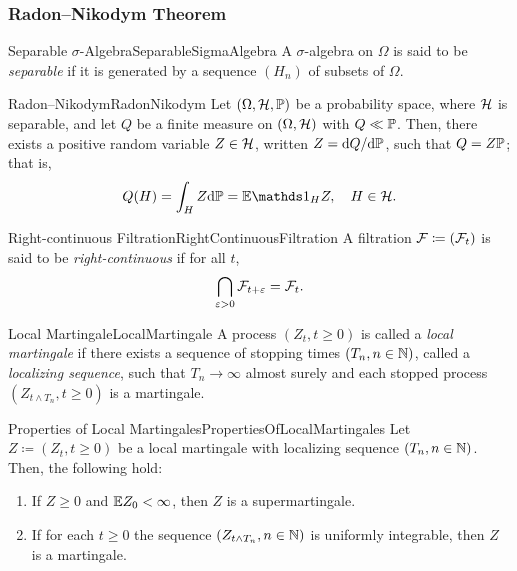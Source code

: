 \subsubsection{Radon--Nikodym Theorem}%
\begin{defn}{Separable \(\sigma\)-Algebra}{SeparableSigmaAlgebra}
	A \(\sigma\)-algebra on \(\Omega\) is said to be \emph{separable} if it is generated by a sequence \((H_n)\) of subsets of \(\Omega\).
\end{defn}

\begin{thm}{Radon--Nikodym}{RadonNikodym}%
	Let \((\Omega, \mathcal{H}, \mathbb{P})\) be a probability space, where \(\mathcal{H}\) is separable, and let \(Q\) be a finite measure on \((\Omega, \mathcal{H})\) with \(Q \ll \mathbb{P}\). Then, there exists a positive random variable \(Z \in \mathcal{H}\), written \(Z = \mathrm{d} Q / \mathrm{d} \mathbb{P}\), such that \(Q = Z \mathbb{P}\); that is,
	\begin{equation}\label{eq:RadonNikodymFormula}
		Q(H) = \int_H Z \di \Pm = \E \I_H Z, \quad H \in \cH.
	\end{equation}
\end{thm}

\begin{defn}{Right-continuous Filtration}{RightContinuousFiltration}
	A filtration \(\mathcal{F} \coloneqq (\mathcal{F}_t)\) is said to be \emph{right-continuous} if for all \(t\),
	\begin{equation*}
		\bigcap_{\varepsilon > 0} \mathcal{F}_{t+\varepsilon} = \mathcal{F}_t.
	\end{equation*}
\end{defn}

\begin{defn}{Local Martingale}{LocalMartingale}
	A process \((Z_t, t \ge 0)\) is called a \emph{local martingale} if there exists a sequence of stopping times \((T_n, n \in \mathbb{N})\), called a \emph{localizing sequence}, such that \(T_n \to \infty\) almost surely and each stopped process \((Z_{t \land T_n}, t \ge 0)\) is a martingale.
\end{defn}

\begin{thm}{Properties of Local Martingales}{PropertiesOfLocalMartingales}
	Let \(Z \coloneqq (Z_t, t \ge 0)\) be a local martingale with localizing sequence \((T_n, n \in \mathbb{N})\). Then, the following hold:
	\begin{enumerate}
		\item If \(Z \ge 0\) and \(\mathbb{E} Z_0 < \infty\), then \(Z\) is a supermartingale.
		\item If for each \(t \ge 0\) the sequence \((Z_{t \land T_n}, n \in \mathbb{N})\) is uniformly integrable, then \(Z\) is a martingale.
	\end{enumerate}
\end{thm}

